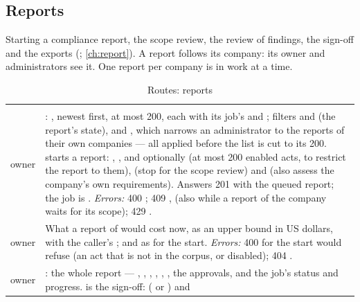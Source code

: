 \subsection{Reports}\label{sec:api:reports}

Starting a compliance report, the scope review, the review of findings, the sign-off and the
exports (; \cref{ch:report}). A report follows its company: its
owner and administrators see it. One report per company is in work at a time.

\begin{xltabular}{\textwidth}{@{}L{19mm}Y@{}}
\caption{Routes: reports}\label{tab:api:reports}\\
\toprule {} &  \\ \midrule \endfirsthead
\toprule {} &  \\ \midrule \endhead
\bottomrule \endlastfoot
{}
owner & : , newest first, at most 200, each with its job's
   and ; filters  and  (the
  report's state), and , which narrows an administrator to the reports of
  their own companies --- all applied before the list is cut to its 200.  starts a report:
  , , and optionally  (at most 200 enabled
  acts, to restrict the report to them),  (stop for the scope review) and
   (also assess the company's own requirements). Answers 201 with the queued
  report; the job is . \emph{Errors:} 400 ; 409
  ,  (also while a report of the company waits for
  its scope); 429 . \\
\addlinespace
{}
owner & What a report of  would cost now, as an upper bound in US dollars,
  with the caller's ;  and  as for the
  start. \emph{Errors:} 400  for  the start would
  refuse (an act that is not in the corpus, or disabled); 404 . \\
\addlinespace
{}
owner & : the whole report --- , , ,
  , , , the approvals, and the job's status and
  progress.  is the sign-off:  ( or ) and

\end{xltabular}
